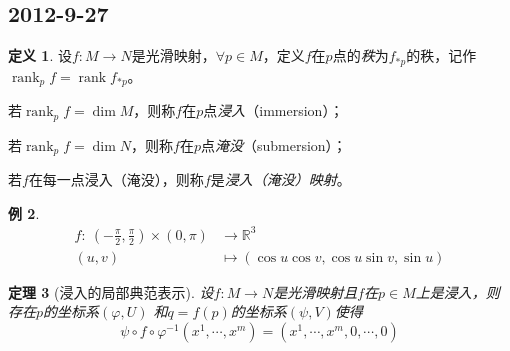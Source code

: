 \documentclass[winfonts,UTF8,c5size,a4paper,fancyhdr,hyperref,titlepage,nocap]{ctexart}
\newtheorem{thm}{定理}
\newtheorem{exa}[thm]{例}
\theoremstyle{definition}
\newtheorem{defn}[thm]{定义}
\theoremstyle{remark}
\numberwithin{equation}{subsection}
\newcommand{\Real}{\mathbb{R}}
\newcommand{\red}{\color{red}}
\newcommand{\rank}{\operatorname{rank}}
\newcommand{\mapdes}[5]
  {
    \begin{align*}
      #1\colon\  #2 & \longrightarrow  #3 \\
            #4 & \mapsto  #5
    \end{align*}
  }
\begin{document}
\subsection*{2012-9-27}
\begin{defn}
  设$f\colon M\to N$是光滑映射，$\forall p\in M$，定义$f$在$p$点的\emph{\red 秩}为$f_{\ast p}$的秩，记作$\rank_p f = \rank f_{\ast p}$。

若$\rank_p f=\dim M$，则称$f$在$p$点\emph{\red 浸入}（immersion）；

若$\rank_p f=\dim N$，则称$f$在$p$点\emph{\red 淹没}（submersion）；

若$f$在每一点浸入（淹没），则称$f$是\emph{\red 浸入（淹没）映射}。
\end{defn}
\begin{exa}
\mapdes{f}{(-\frac{\pi}{2},\frac{\pi}{2})\times(0,\pi)}{\Real^3}{(u,v)}{(\cos u\cos v,\cos u\sin v,\sin u)}
\end{exa}
\begin{thm}[浸入的局部典范表示]
设$f\colon M\to N$是光滑映射且$f$在$p\in M$上是浸入，则存在$p$的坐标系$(\varphi,U)$ 和$q=f(p)$的坐标系$(\psi,V)$使得
\begin{equation*}
\psi\circ f\circ\varphi^{-1}(x^1,\cdots,x^m)=(x^1,\cdots,x^m,0,\cdots,0)
\end{equation*}
\end{thm}
\end{document}

